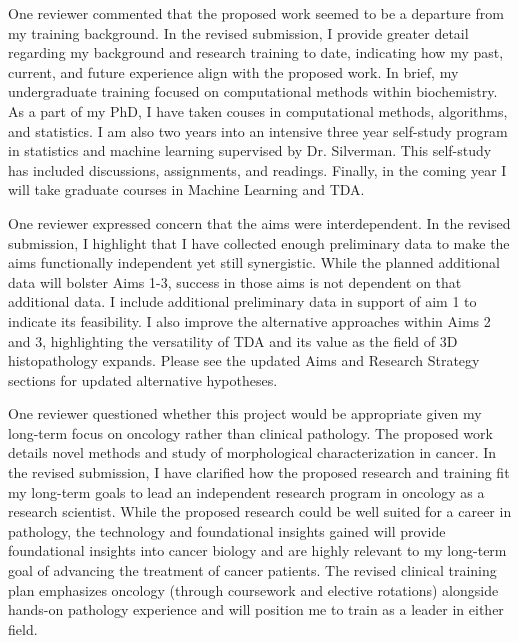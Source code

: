 \documentclass{nihgrant}
\begin{document}
One reviewer commented that the proposed work seemed to be a departure from my training background. In the revised submission, I provide greater detail regarding my background and research training to date, indicating how my past, current, and future experience align with the proposed work. In brief, my undergraduate training focused on computational methods within biochemistry. As a part of my PhD, I have taken couses in computational methods, algorithms, and statistics. I am also two years into an intensive three year self-study program in statistics and machine learning supervised by Dr. Silverman. This self-study has included discussions, assignments, and readings. Finally, in the coming year I will take graduate courses in Machine Learning and TDA.

One reviewer expressed concern that the aims were interdependent. In the revised submission, I highlight that I have collected enough preliminary data to make the aims functionally independent yet still synergistic. While the planned additional data will bolster Aims 1-3, success in those aims is not dependent on that additional data. I include additional preliminary data in support of aim 1 to indicate its feasibility. I also improve the alternative approaches within Aims 2 and 3, highlighting the versatility of TDA and its value as the field of 3D histopathology expands. Please see the updated Aims and Research Strategy sections for updated alternative hypotheses.

One reviewer questioned whether this project would be appropriate given my long-term focus on oncology rather than clinical pathology. The proposed work details novel methods and study of morphological characterization in cancer. In the revised submission, I have clarified how the proposed research and training fit my long-term goals to lead an independent research program in oncology as a research scientist. While the proposed research could be well suited for a career in pathology, the technology and foundational insights gained will provide foundational insights into cancer biology and are highly relevant to my long-term goal of advancing the treatment of cancer patients. The revised clinical training plan emphasizes oncology (through coursework and elective rotations) alongside hands-on pathology experience and will position me to train as a leader in either field.  %
\end{document}
